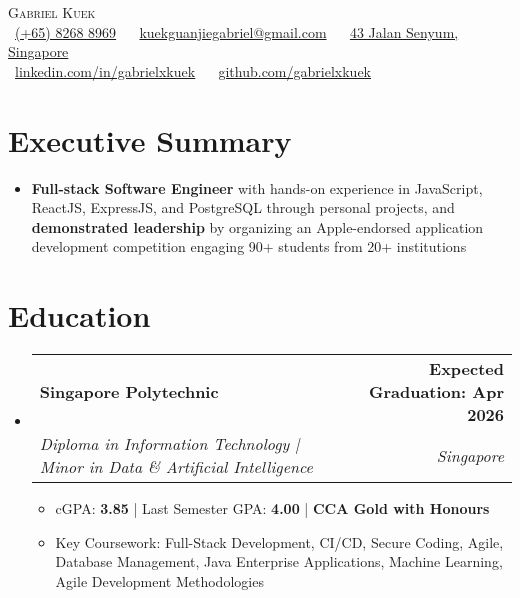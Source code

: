 \documentclass[letterpaper,11pt]{article}
\makeatletter
\newcommand{\resumeItem}[1]{
  \item\small{#1}
}
\newcommand{\resumeSubheading}[4]{
  \vspace{-2pt}\item
    \begin{tabular*}{1.0\textwidth}[t]{l@{\extracolsep{\fill}}r}
      \textbf{#1} & \textbf{\small #2} \\
      \textit{\small#3} & \textit{\small #4} \\
    \end{tabular*}\vspace{-7pt}
}
\newcommand{\resumeSubHeadingListStart}{\begin{itemize}[leftmargin=0.0in, label={}]}
\newcommand{\resumeSubHeadingListEnd}{\end{itemize}}
\newcommand{\resumeItemListStart}{\begin{itemize}}
\newcommand{\resumeItemListEnd}{\end{itemize}\vspace{-5pt}}
\makeatother
\begin{document}
\begin{center}
    {\Large \scshape Gabriel Kuek} \\[2mm]
    \footnotesize
    \faPhone\ \underline{(+65) 8268 8969} ~ 
    {\faEnvelope\  \underline{kuekguanjiegabriel@gmail.com}} ~ 
    {\faHome\ \underline{43 Jalan Senyum, Singapore}} \\[1mm]
    {\faLinkedin\ \underline{\href{https://www.linkedin.com/in/gabrielxkuek/}{linkedin.com/in/gabrielxkuek}}}  ~
    {\faGithub\ \underline{\href{https://github.com/gabrielxkuek}{github.com/gabrielxkuek}}}
    \vspace{-8pt}
\end{center}

\section{Executive Summary}
  \resumeSubHeadingListStart
    \resumeItemListStart
        \resumeItem{\textbf{Full-stack Software Engineer} with hands-on experience in JavaScript, ReactJS, ExpressJS, and PostgreSQL through personal projects, and \textbf{demonstrated leadership} by organizing an Apple-endorsed application development competition engaging 90+ students from 20+ institutions}
    \resumeItemListEnd
  \resumeSubHeadingListEnd
\vspace{-16pt}

\section{Education}
  \resumeSubHeadingListStart
    \resumeSubheading
      {Singapore Polytechnic}{Expected Graduation: Apr 2026}
      {Diploma in Information Technology | Minor in Data \& Artificial Intelligence}{Singapore}
    \resumeItemListStart
        \resumeItem{cGPA: \textbf{3.85} | Last Semester GPA: \textbf{4.00} | \textbf{CCA Gold with Honours}}
        \resumeItem{Key Coursework: Full-Stack Development, CI/CD, Secure Coding, Agile, Database Management, Java Enterprise Applications, Machine Learning, Agile Development Methodologies}
    \resumeItemListEnd
  \resumeSubHeadingListEnd
\vspace{-16pt}

\end{document}
